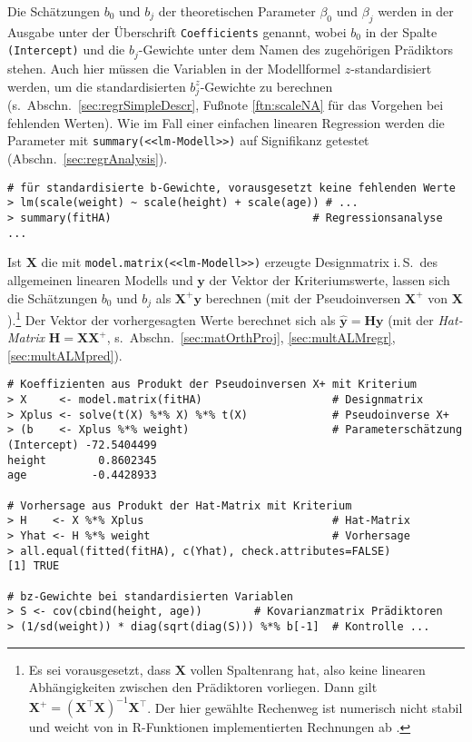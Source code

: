 Die Schätzungen $b_{0}$ und $b_{j}$ der theoretischen Parameter $\beta_{0}$ und $\beta_{j}$ werden in der Ausgabe unter der Überschrift \lstinline!Coefficients! genannt, wobei $b_{0}$ in der Spalte \lstinline!(Intercept)! und die $b_{j}$-Gewichte unter dem Namen des zugehörigen Prädiktors stehen. Auch hier müssen die Variablen in der Modellformel $z$-standardisiert werden, um die standardisierten $b_{j}^{z}$-Gewichte zu berechnen (s.\ Abschn.\ \ref{sec:regrSimpleDescr}, Fußnote \ref{ftn:scaleNA} für das Vorgehen bei fehlenden Werten). Wie im Fall einer einfachen linearen Regression werden die Parameter mit \lstinline!summary(<<lm-Modell>>)! auf Signifikanz getestet (Abschn.\ \ref{sec:regrAnalysis}).
\begin{lstlisting}
# für standardisierte b-Gewichte, vorausgesetzt keine fehlenden Werte
> lm(scale(weight) ~ scale(height) + scale(age)) # ...
> summary(fitHA)                               # Regressionsanalyse ...
\end{lstlisting}

Ist $\bm{X}$ die mit \lstinline!model.matrix(<<lm-Modell>>)! erzeugte Designmatrix i.\,S.\ des allgemeinen linearen Modells und $\bm{y}$ der Vektor der Kriteriumswerte, lassen sich die Schätzungen $b_{0}$ und $b_{j}$ als $\bm{X}^{+} \bm{y}$ berechnen (mit der Pseudoinversen $\bm{X}^{+}$ von $\bm{X}$).\footnote{Es sei vorausgesetzt, dass $\bm{X}$ vollen Spaltenrang hat, also keine linearen Abhängigkeiten zwischen den Prädiktoren vorliegen. Dann gilt $\bm{X}^{+} = (\bm{X}^{\top} \bm{X})^{-1} \bm{X}^{\top}$. Der hier gewählte Rechenweg ist numerisch nicht stabil und weicht von in R-Funktionen implementierten Rechnungen ab \cite{Bates2004}.} Der Vektor der vorhergesagten Werte berechnet sich als $\hat{\bm{y}} = \bm{H} \bm{y}$ (mit der \emph{Hat-Matrix} $\bm{H} = \bm{X} \bm{X}^{+}$, s.\ Abschn.\ \ref{sec:matOrthProj}, \ref{sec:multALMregr}, \ref{sec:multALMpred}).
\begin{lstlisting}
# Koeffizienten aus Produkt der Pseudoinversen X+ mit Kriterium
> X     <- model.matrix(fitHA)                    # Designmatrix
> Xplus <- solve(t(X) %*% X) %*% t(X)             # Pseudoinverse X+
> (b    <- Xplus %*% weight)                      # Parameterschätzung
(Intercept) -72.5404499
height        0.8602345
age          -0.4428933

# Vorhersage aus Produkt der Hat-Matrix mit Kriterium
> H    <- X %*% Xplus                             # Hat-Matrix
> Yhat <- H %*% weight                            # Vorhersage
> all.equal(fitted(fitHA), c(Yhat), check.attributes=FALSE)
[1] TRUE

# bz-Gewichte bei standardisierten Variablen
> S <- cov(cbind(height, age))        # Kovarianzmatrix Prädiktoren
> (1/sd(weight)) * diag(sqrt(diag(S))) %*% b[-1]  # Kontrolle ...
\end{lstlisting}

